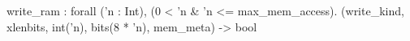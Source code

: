 write_ram : forall ('n : Int), (0 < 'n & 'n <= max_mem_access).
  (write_kind, xlenbits, int('n), bits(8 * 'n), mem_meta) -> bool